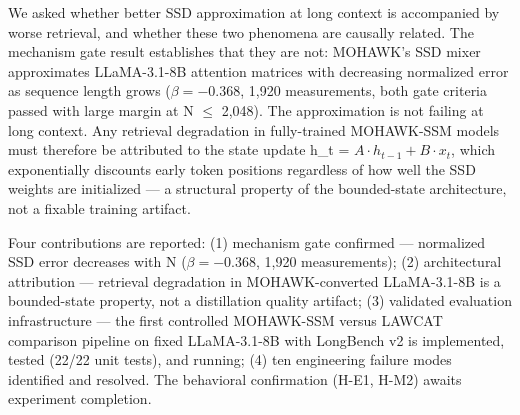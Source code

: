 
We asked whether better SSD approximation at long context is accompanied by worse retrieval, and whether these two phenomena are causally related. The mechanism gate result establishes that they are not: MOHAWK's SSD mixer approximates LLaMA-3.1-8B attention matrices with decreasing normalized error as sequence length grows ($\beta = -0.368$, 1,920 measurements, both gate criteria passed with large margin at N $\leq$ 2,048). The approximation is not failing at long context. Any retrieval degradation in fully-trained MOHAWK-SSM models must therefore be attributed to the state update h\_t = $A\cdot h_{t-1} + B\cdot x_t$, which exponentially discounts early token positions regardless of how well the SSD weights are initialized --- a structural property of the bounded-state architecture, not a fixable training artifact.

Four contributions are reported: (1) mechanism gate confirmed --- normalized SSD error decreases with N ($\beta = -0.368$, 1,920 measurements); (2) architectural attribution --- retrieval degradation in MOHAWK-converted LLaMA-3.1-8B is a bounded-state property, not a distillation quality artifact; (3) validated evaluation infrastructure --- the first controlled MOHAWK-SSM versus LAWCAT comparison pipeline on fixed LLaMA-3.1-8B with LongBench v2 is implemented, tested (22/22 unit tests), and running; (4) ten engineering failure modes identified and resolved. The behavioral confirmation (H-E1, H-M2) awaits experiment completion.

